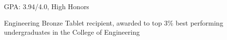 \begin{cvitemize}
    \item GPA: 3.94/4.0, High Honors
    \item Engineering Bronze Tablet recipient, awarded to top 3\% best performing undergraduates in the College of Engineering
\end{cvitemize}